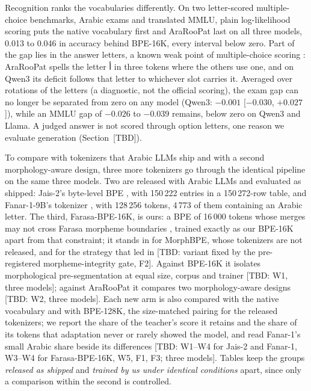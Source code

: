 Recognition ranks the vocabularies differently. On two letter-scored multiple-choice benchmarks, Arabic exams and
translated MMLU, plain log-likelihood scoring puts the native vocabulary first and AraRooPat last on all three models,
0.013 to 0.046 in accuracy behind BPE-16K, every interval below zero. Part of the gap lies in the answer letters, a
known weak point of multiple-choice scoring \citep{zheng2024large}: AraRooPat spells the letter \textarabic{أ} in three
tokens where the others use one, and on Qwen3 its deficit follows that letter to whichever slot carries it. Averaged
over rotations of the letters (a diagnostic, not the official scoring), the exam gap can no longer be separated from
zero on any model (Qwen3: $-0.001$ [$-0.030$, $+0.027$]), while an MMLU gap of $-0.026$ to $-0.039$ remains, below zero
on Qwen3 and Llama. A judged answer is not scored through option letters, one reason we evaluate generation
(Section~[TBD]).

To compare with tokenizers that Arabic LLMs ship and with a second morphology-aware design, three more tokenizers go
through the identical pipeline on the same three models. Two are released with Arabic LLMs and evaluated as shipped:
Jais-2's byte-level BPE \citep{anwar2026jais2}, with 150\,222 entries in a 150\,272-row table, and Fanar-1-9B's
tokenizer \citep{fanarteam2025fanar}, with 128\,256 tokens, 4\,773 of them containing an Arabic letter. The third,
Farasa-BPE-16K, is ours: a BPE of 16\,000 tokens whose merges may not cross Farasa morpheme boundaries
\citep{abdelali-etal-2016-farasa}, trained exactly as our BPE-16K apart from that constraint; it stands in for MorphBPE,
whose tokenizers are not released, and for the strategy that led in \citet{alrefaie2024exploring} [TBD: variant fixed
by the pre-registered morpheme-integrity gate, F2]. Against BPE-16K it isolates morphological pre-segmentation at equal
size, corpus and trainer [TBD: W1, three models]; against AraRooPat it compares two morphology-aware designs [TBD: W2,
three models]. Each new arm is also compared with the native vocabulary and with BPE-128K, the size-matched pairing for
the released tokenizers; we report the share of the teacher's score it retains and the share of its tokens that
adaptation never or rarely showed the model, and read Fanar-1's small Arabic share beside its differences [TBD: W1--W4
for Jais-2 and Fanar-1, W3--W4 for Farasa-BPE-16K, W5, F1, F3; three models]. Tables keep the groups \textit{released
as shipped} and \textit{trained by us under identical conditions} apart, since only a comparison within the second is
controlled.

